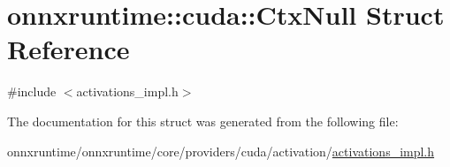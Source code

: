 \hypertarget{structonnxruntime_1_1cuda_1_1CtxNull}{}\section{onnxruntime\+:\+:cuda\+:\+:Ctx\+Null Struct Reference}
\label{structonnxruntime_1_1cuda_1_1CtxNull}


{\ttfamily \#include $<$activations\+\_\+impl.\+h$>$}



The documentation for this struct was generated from the following file\+:\begin{DoxyCompactItemize}
\item 
onnxruntime/onnxruntime/core/providers/cuda/activation/\mbox{\hyperlink{activations__impl_8h}{activations\+\_\+impl.\+h}}\end{DoxyCompactItemize}
